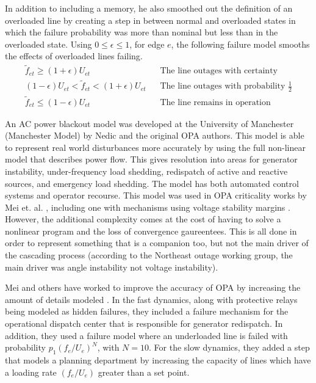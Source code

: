 In addition to including a memory, he also smoothed out the definition of an overloaded line by creating a step in between normal and overloaded states in which the failure probability was more than nominal but less than in the overloaded state.  Using $0 \le \epsilon \le 1$, for edge $e$, the following failure model smooths the effects of overloaded lines failing.
\begin{align}
\tilde{f}_{et} \ge (1+\epsilon) U_{et}			&	\hspace{10pt} \mbox{The line outages with certainty} 	\\
(1-\epsilon) U_{et} < \tilde{f}_{et} < (1+\epsilon) U_{et}	&	\hspace{10pt} \mbox{The line outages with probability }\frac{1}{2} 	\\
\tilde{f}_{et} \le (1-\epsilon) U_{et}			&	\hspace{10pt} \mbox{The line remains in operation} 
\end{align}

An AC power blackout model was developed at the University of Manchester (Manchester Model) by Nedic \cite{nedic_2006} and the original OPA authors.  This model is able to represent real world disturbances more accurately by using the full non-linear model that describes power flow.  This gives resolution into areas for generator instability, under-frequency load shedding, redispatch of active and reactive sources, and emergency load shedding.  The model has both automated control systems and operator recourse.  This model was used in OPA criticality works by Mei et. al. \cite{mei_2006}, including one with mechanisms using voltage stability margins \cite{mei_2008}.  However, the additional complexity comes at the cost of having to solve a nonlinear program and the loss of convergence gaureentees.  This is all done in order to represent something that is a companion too, but not the main driver of the cascading process (according to the Northeast outage working group, the main driver was angle instability not voltage instability).

Mei and others have worked to improve the accuracy of OPA by increasing the amount of details modeled \cite{mei_2009}.  In the fast dynamics, along with protective relays being modeled as hidden failures, they included a failure mechanism for the operational dispatch center that is responsible for generator redispatch.  In addition, they used a failure model where an underloaded line is failed with probability $p_1 \left( f_e/U_e \right)^N$, with $N=10$.  For the slow dynamics, they added a step that models a planning department by increasing the capacity of lines which have a loading rate $\left( f_{e}/ U_{e}  \right)$ greater than a set point.  

